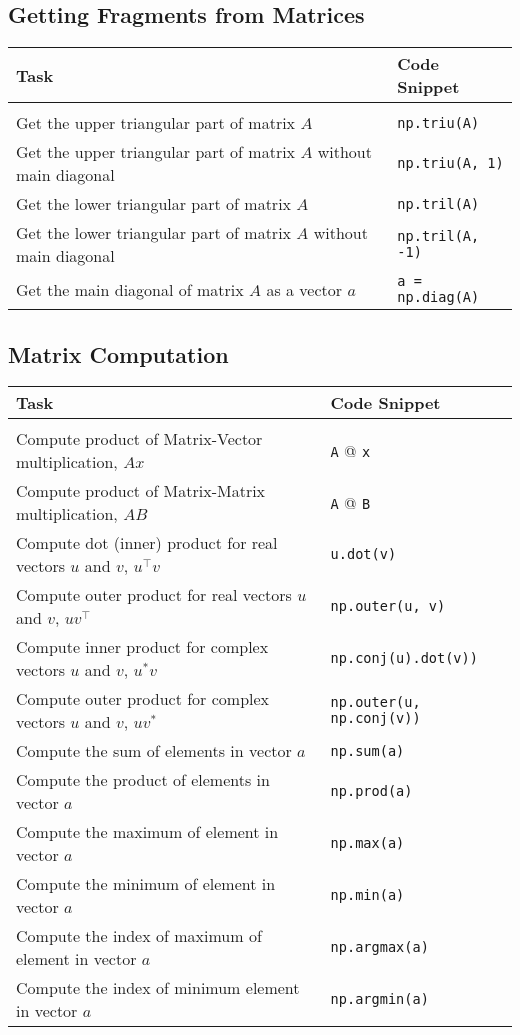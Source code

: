 \documentclass[a4paper,11pt]{article}
\begin{document}
\subsection*{Getting Fragments from Matrices}
\begin{tabular}{p{9cm} | p{5cm}}
  Task & Code Snippet \\
  \hline \\
  Get the upper triangular part of matrix $A$ &  \texttt{np.triu(A)} \\
  Get the upper triangular part of matrix $A$ without main diagonal&  \texttt{np.triu(A, 1)} \\
  Get the lower triangular part of matrix $A$ &  \texttt{np.tril(A)}\\
  Get the lower triangular part of matrix $A$ without main diagonal &  \texttt{np.tril(A, -1)} \\
  Get the main diagonal of matrix $A$ as a vector $a$  &  \texttt{a = np.diag(A)} \\
\end{tabular}
\subsection*{Matrix Computation}
\begin{tabular}{p{10cm} |p{5cm}}
  Task & Code Snippet \\
  \hline \\
  Compute product of Matrix-Vector multiplication, $Ax$ & \texttt{A} @ \texttt{x}  \\
  Compute product of Matrix-Matrix multiplication, $AB$ & \texttt{A} @ \texttt{B}  \\
  Compute dot (inner) product for real vectors $u$ and $v$, $u^{\top}v$ &  \texttt{u.dot(v)}\\
  Compute outer product for real vectors $u$ and  $v$,  $uv^{\top}$ & \texttt{np.outer(u, v)}\\
  Compute inner product for complex vectors $u$ and  $v$, $u^{*}v$ & \texttt{np.conj(u).dot(v))} \\
  Compute outer product for complex vectors $u$ and  $v$,  $uv^{*}$ & \texttt{np.outer(u, np.conj(v))}\\
  Compute the sum of elements in vector \(a\) & \texttt{np.sum(a)} \\
  Compute the product of elements in vector \(a\) & \texttt{np.prod(a)} \\
  Compute the maximum of element in vector \(a\) & \texttt{np.max(a)} \\
  Compute the minimum of element in vector \(a\) & \texttt{np.min(a)} \\
  Compute the index of maximum of element in vector \(a\) & \texttt{np.argmax(a)} \\
  Compute the index of minimum element in vector \(a\) & \texttt{np.argmin(a)} \\
\end{tabular}
\newpage
\end{document}
